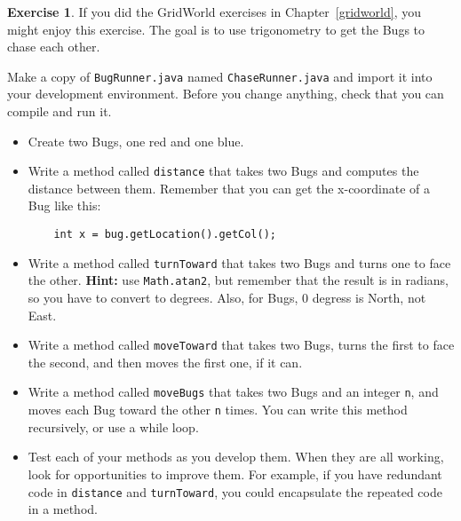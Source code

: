 \documentclass[12pt]{book}
\def\HINT{\textbf{Hint:}}
\theoremstyle{definition}
\newtheorem{excz}{Exercise}[chapter]
\newenvironment{exercise}{\bigskip\begin{excz}\mbox{}}{\end{excz}}
\begin{document}
\begin{exercise}

If you did the GridWorld exercises in Chapter~\ref{gridworld}, you
might enjoy this exercise.  The goal is to use trigonometry to get the
Bugs to chase each other.

Make a copy of {\tt BugRunner.java} named {\tt ChaseRunner.java} and
import it into your development environment.  Before you change
anything, check that you can compile and run it.

\begin{itemize}

\item Create two Bugs, one red and one blue.

\item Write a method called {\tt distance} that takes two Bugs
and computes the distance between them.  Remember that you can
get the x-coordinate of a Bug like this:

\begin{lstlisting}
    int x = bug.getLocation().getCol();
\end{lstlisting}

\item Write a method called {\tt turnToward} that takes two
Bugs and turns one to face the other.  \HINT{} use {\tt Math.atan2},
but remember that the result is in radians, so you have to
convert to degrees.  Also, for Bugs, 0 degress is North, not East.

\item Write a method called {\tt moveToward} that takes two
Bugs, turns the first to face the second, and then moves the
first one, if it can.

\item Write a method called {\tt moveBugs} that takes two Bugs
and an integer {\tt n}, and moves each Bug toward the other {\tt n}
times.  You can write this method recursively, or use a while loop.

\item Test each of your methods as you develop them.  When they are
  all working, look for opportunities to improve them.  For example,
  if you have redundant code in {\tt distance} and {\tt turnToward},
  you could encapsulate the repeated code in a method.

\end{itemize}

\end{exercise}
\end{document}
